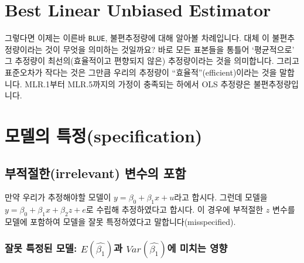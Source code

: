\documentclass[
]{book}
\begin{document}
\hypertarget{best-linear-unbiased-estimator}{%
\section{\texorpdfstring{\textbf{B}est \textbf{L}inear \textbf{U}nbiased \textbf{E}stimator}{Best Linear Unbiased Estimator}}\label{best-linear-unbiased-estimator}}

그렇다면 이제는 이른바 \texttt{BLUE}, 불편추정량에 대해 알아볼 차례입니다. 대체 이 불편추정량이라는 것이 무엇을 의미하는 것일까요? 바로 모든 표본들을 통틀어 `평균적으로' 그 추정량이 최선의(효율적이고 편향되지 않은) 추정량이라는 것을 의미합니다. 그리고 표준오차가 작다는 것은 그만큼 우리의 추정량이 ``효율적''(efficient)이라는 것을 말합니다. MLR.1부터 MLR.5까지의 가정이 충족되는 하에서 OLS 추정량은 불편추정량입니다.

\hypertarget{uxbaa8uxb378uxc758-uxd2b9uxc815specification}{%
\section{모델의 특정(specification)}\label{uxbaa8uxb378uxc758-uxd2b9uxc815specification}}

\hypertarget{uxbd80uxc801uxc808uxd55cirrelevant-uxbcc0uxc218uxc758-uxd3ecuxd568}{%
\subsection{부적절한(irrelevant) 변수의 포함}\label{uxbd80uxc801uxc808uxd55cirrelevant-uxbcc0uxc218uxc758-uxd3ecuxd568}}

만약 우리가 추정해야할 모델이 \(y = \beta_0 + \beta_1x + u\)라고 합시다. 그런데 모델을 \(y = \beta_0 + \beta_1x + \beta_2z + e\)로 수립해 추정하였다고 합시다. 이 경우에 부적절한 \(z\) 변수를 모델에 포함하여 모델을 잘못 특정하였다고 말합니다(misspecified).

\hypertarget{uxc798uxbabb-uxd2b9uxc815uxb41c-uxbaa8uxb378-ehatbeta_1uxacfc-varhatbeta_1uxc5d0-uxbbf8uxce58uxb294-uxc601uxd5a5}{%
\subsubsection{\texorpdfstring{잘못 특정된 모델: \(E(\hat{\beta_1})\)과 \(Var(\hat{\beta_1})\)에 미치는 영향}{잘못 특정된 모델: E(\textbackslash hat\{\textbackslash beta\_1\})과 Var(\textbackslash hat\{\textbackslash beta\_1\})에 미치는 영향}}\label{uxc798uxbabb-uxd2b9uxc815uxb41c-uxbaa8uxb378-ehatbeta_1uxacfc-varhatbeta_1uxc5d0-uxbbf8uxce58uxb294-uxc601uxd5a5}}
\end{document}
